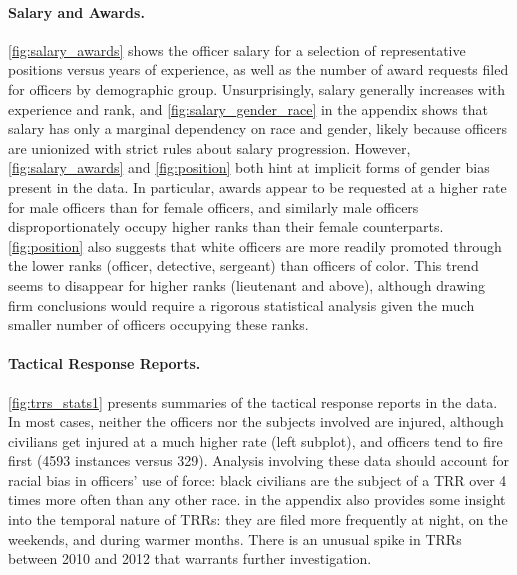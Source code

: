 \paragraph{Salary and Awards.}
\cref{fig:salary_awards} shows the officer salary for a selection of
representative positions versus years of experience, as well as the number of
award requests filed for officers by demographic group.  Unsurprisingly, salary
generally increases with experience and rank, and \cref{fig:salary_gender_race}
in the appendix shows that salary has only a marginal dependency on race and
gender, likely because officers are unionized with strict rules about salary
progression. However, \cref{fig:salary_awards} and \cref{fig:position} both
hint at implicit forms of gender bias present in the data. In particular,
awards appear to be requested at a higher rate for male officers than for
female officers, and similarly male officers disproportionately occupy higher
ranks than their female counterparts. \cref{fig:position} also suggests that
white officers are more readily promoted through the lower ranks (officer,
detective, sergeant) than officers of color.  This trend seems to disappear for
higher ranks (lieutenant and above), although drawing firm conclusions would
require a rigorous statistical analysis given the much smaller number of
officers occupying these ranks.

\paragraph{Tactical Response Reports.}
\cref{fig:trrs_stats1} presents summaries of the tactical response reports in
the data.  In most cases, neither the officers nor the subjects involved are
injured, although civilians get injured at a much higher rate (left subplot),
and officers tend to fire first (4593 instances versus 329).  Analysis
involving these data should account for racial bias in officers' use of force:
black civilians are the subject of a TRR over 4 times more often than any other
race.  in the appendix also provides some insight into the
temporal nature of TRRs: they are filed more frequently at night, on the
weekends, and during warmer months. There is an unusual spike in TRRs between
2010 and 2012 that warrants further investigation.






